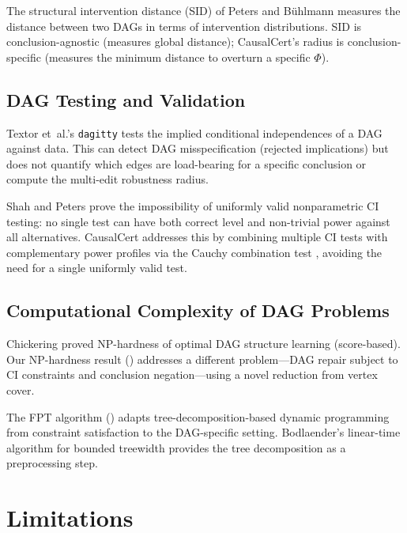 \documentclass[11pt,a4paper]{article}
\theoremstyle{definition}
\theoremstyle{remark}
\newcommand{\Phi}{\varPhi}
\begin{document}
The structural intervention distance (SID) of Peters and B\"uhlmann \cite{peters2015}
measures the distance between two DAGs in terms of intervention distributions. SID is
conclusion-agnostic (measures global distance); CausalCert's radius is
conclusion-specific (measures the minimum distance to overturn a specific $\Phi$).

\subsection{DAG Testing and Validation}

Textor et~al.'s \texttt{dagitty} \cite{textor2016} tests the implied conditional
independences of a DAG against data. This can detect DAG misspecification (rejected
implications) but does not quantify which edges are load-bearing for a specific
conclusion or compute the multi-edit robustness radius.

Shah and Peters \cite{shah2020} prove the impossibility of uniformly valid nonparametric
CI testing: no single test can have both correct level and non-trivial power against all
alternatives. CausalCert addresses this by combining multiple CI tests with complementary
power profiles via the Cauchy combination test \cite{liu2020}, avoiding the need for a
single uniformly valid test.

\subsection{Computational Complexity of DAG Problems}

Chickering \cite{chickering1996} proved NP-hardness of optimal DAG structure learning
(score-based). Our NP-hardness result () addresses a different
problem---DAG repair subject to CI constraints and conclusion negation---using a novel
reduction from vertex cover.

The FPT algorithm () adapts tree-decomposition-based dynamic programming
from constraint satisfaction \cite{freuder1990} to the DAG-specific setting.
Bodlaender's linear-time algorithm for bounded treewidth \cite{bodlaender1996} provides
the tree decomposition as a preprocessing step.

\section{Limitations}\label{sec:limitations}
\end{document}
